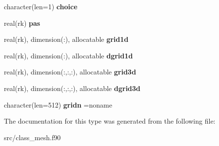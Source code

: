 \begin{DoxyCompactItemize}
character(len=1) {\bfseries choice}
\item 
\mbox{\label{structclass__mesh_1_1mesh__grid_ad57b797415bbdf287f99603d8f356d94}} 
real(rk) {\bfseries pas}
\item 
\mbox{\label{structclass__mesh_1_1mesh__grid_ae45d22b0ad33655b5f2e132ba1e2e456}} 
real(rk), dimension(\+:), allocatable {\bfseries grid1d}
\item 
\mbox{\label{structclass__mesh_1_1mesh__grid_af891a40b479f751bd473aadb55c8da5f}} 
real(rk), dimension(\+:), allocatable {\bfseries dgrid1d}
\item 
\mbox{\label{structclass__mesh_1_1mesh__grid_a26b37481f568a525946cf24e4952262b}} 
real(rk), dimension(\+:,\+:,\+:), allocatable {\bfseries grid3d}
\item 
\mbox{\label{structclass__mesh_1_1mesh__grid_a205101b7791746b84bcca2ec61dd5002}} 
real(rk), dimension(\+:,\+:,\+:), allocatable {\bfseries dgrid3d}
\item 
\mbox{\label{structclass__mesh_1_1mesh__grid_ac60933a854daec3ec32546c4107c8fba}} 
character(len=512) {\bfseries gridn} =\textquotesingle{}noname\textquotesingle{}
\end{DoxyCompactItemize}


The documentation for this type was generated from the following file\+:\begin{DoxyCompactItemize}
\item 
src/class\+\_\+mesh.\+f90\end{DoxyCompactItemize}
